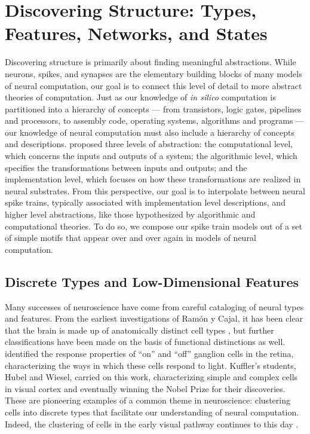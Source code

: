 \section{Discovering Structure: Types, Features, Networks, and States}
Discovering structure is primarily about finding meaningful abstractions.  
While neurons, spikes, and
synapses are the elementary building blocks of many models of neural
computation, our goal is to connect this level of detail to more
abstract theories of computation.  Just as our knowledge of
\emph{in silico} computation is partitioned into a hierarchy of
concepts --- from transistors, logic gates, pipelines and processors,
to assembly code, operating systems, algorithms and programs --- our
knowledge of neural computation must also include a hierarchy of
concepts and descriptions.  \citet{marr1982vision} proposed three
levels of abstraction: the computational level, which concerns the inputs
and outputs of a system; the algorithmic level, which specifies the
transformations between inputs and outputs; and the implementation
level, which focuses on how these transformations are realized in
neural substrates.  From this perspective, our goal is to interpolate
between neural spike trains, typically associated with implementation
level descriptions, and higher level abstractions, like those
hypothesized by algorithmic and computational theories. To do so,
we compose our spike train models out of a set of simple
motifs that appear over and over again in models of
neural computation. 

\subsection{Discrete Types and Low-Dimensional Features}
Many successes of neuroscience have come from careful cataloging of
neural types and features.  From the earliest investigations of
Ram\'on y Cajal, it has been clear that the brain is made up of
anatomically distinct cell types \citep{cajal1899textura}, but further
classifications have been made on the basis of functional distinctions
as well. \citet{kuffler1953discharge} identified the response
properties of ``on'' and ``off'' ganglion cells in the retina,
characterizing the ways in which these cells respond to light. 
Kuffler's students, Hubel and Wiesel, carried on this work,
characterizing simple and complex cells in visual cortex
\citep{hubel1962receptive} and eventually winning the Nobel Prize for
their discoveries.  These are pioneering examples of a common theme in
neuroscience: clustering cells into discrete types that facilitate our
understanding of neural computation. Indeed, the clustering of cells
in the early visual pathway continues to this day
\citep{macosko2015highly, sanes2015types}.

